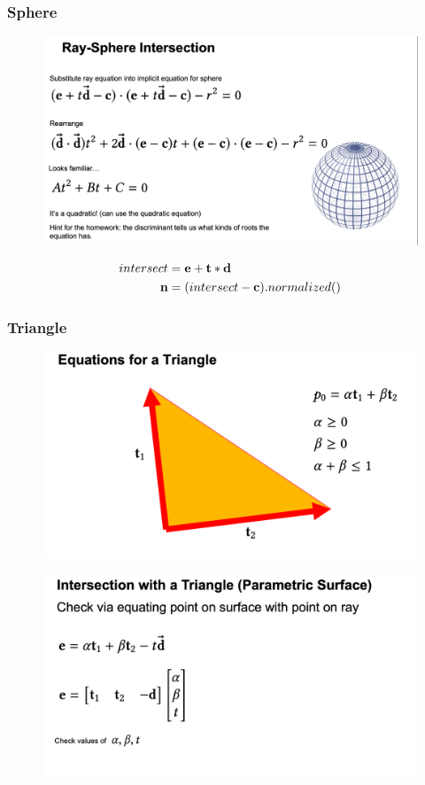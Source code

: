 \documentclass[11pt]{article}
\numberwithin{equation}{section}
\begin{document}
\subsubsection{Sphere}
	\begin{figure}[H]
	\centering
	\includegraphics[scale=0.4]{p31}
	\end{figure}

\begin{align}
	intersect &= \textbf{e} + \textbf{t} * \textbf{d}\\
	\textbf{n} &= (intersect - \textbf{c}).normalized()
\end{align}
	

\subsubsection{Triangle}
	\begin{figure}[H]
	\centering
	\includegraphics[scale=0.4]{p32}
	\end{figure}
	\begin{figure}[H]
	\centering
	\includegraphics[scale=0.4]{p33}
	\end{figure}
	
\end{document}
